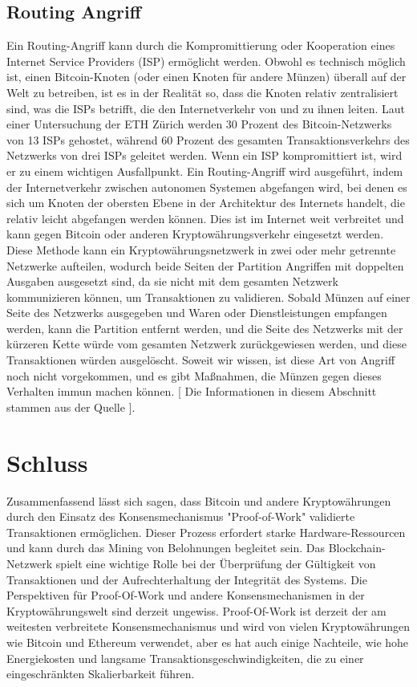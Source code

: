 \section{Routing Angriff}
Ein Routing-Angriff kann durch die Kompromittierung oder Kooperation eines Internet Service Providers (ISP) ermöglicht werden. Obwohl es technisch möglich ist, einen Bitcoin-Knoten (oder einen Knoten für andere Münzen) überall auf der Welt zu betreiben, ist es in der Realität so, dass die Knoten relativ zentralisiert sind, was die ISPs betrifft, die den Internetverkehr von und zu ihnen leiten. Laut einer Untersuchung der ETH Zürich werden 30 Prozent des Bitcoin-Netzwerks von 13 ISPs gehostet, während 60 Prozent des gesamten Transaktionsverkehrs des Netzwerks von drei ISPs geleitet werden. Wenn ein ISP kompromittiert ist, wird er zu einem wichtigen Ausfallpunkt. Ein Routing-Angriff wird ausgeführt, indem der Internetverkehr zwischen autonomen Systemen abgefangen wird, bei denen es sich um Knoten der obersten Ebene in der Architektur des Internets handelt, die relativ leicht abgefangen werden können. Dies ist im Internet weit verbreitet und kann gegen Bitcoin oder anderen Kryptowährungsverkehr eingesetzt werden. Diese Methode kann ein Kryptowährungsnetzwerk in zwei oder mehr getrennte Netzwerke aufteilen, wodurch beide Seiten der Partition Angriffen mit doppelten Ausgaben ausgesetzt sind, da sie nicht mit dem gesamten Netzwerk kommunizieren können, um Transaktionen zu validieren. Sobald Münzen auf einer Seite des Netzwerks ausgegeben und Waren oder Dienstleistungen empfangen werden, kann die Partition entfernt werden, und die Seite des Netzwerks mit der kürzeren Kette würde vom gesamten Netzwerk zurückgewiesen werden, und diese Transaktionen würden ausgelöscht. Soweit wir wissen, ist diese Art von Angriff noch nicht vorgekommen, und es gibt Maßnahmen, die Münzen gegen dieses Verhalten immun machen können. [ Die Informationen in diesem Abschnitt stammen aus der Quelle \cite{allatacks} ].


\chapter{Schluss}
Zusammenfassend lässt sich sagen, dass Bitcoin und andere Kryptowährungen durch den Einsatz des Konsensmechanismus "Proof-of-Work" validierte Transaktionen ermöglichen. Dieser Prozess erfordert starke Hardware-Ressourcen und kann durch das Mining von Belohnungen begleitet sein. Das Blockchain-Netzwerk spielt eine wichtige Rolle bei der Überprüfung der Gültigkeit von Transaktionen und der Aufrechterhaltung der Integrität des Systems. Die Perspektiven für Proof-Of-Work und andere Konsensmechanismen in der Kryptowährungswelt sind derzeit ungewiss. Proof-Of-Work ist derzeit der am weitesten verbreitete Konsensmechanismus und wird von vielen Kryptowährungen wie Bitcoin und Ethereum verwendet, aber es hat auch einige Nachteile, wie hohe Energiekosten und langsame Transaktionsgeschwindigkeiten, die zu einer eingeschränkten Skalierbarkeit führen.

